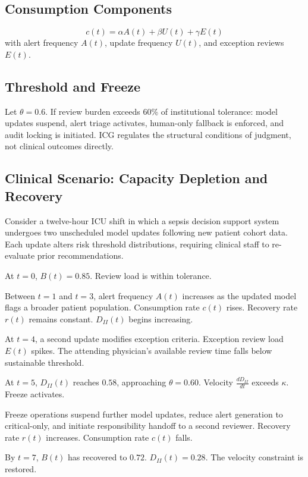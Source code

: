\documentclass[12pt]{article}
\begin{document}
\subsection{Consumption Components}
\[
c(t) = \alpha A(t) + \beta U(t) + \gamma E(t)
\]
with alert frequency $A(t)$, update frequency $U(t)$, and exception reviews $E(t)$.

\subsection{Threshold and Freeze}

Let $\theta = 0.6$. If review burden exceeds 60\% of institutional tolerance: model
updates suspend, alert triage activates, human-only fallback is enforced, and audit
locking is initiated. ICG regulates the structural conditions of judgment, not clinical
outcomes directly.

\subsection{Clinical Scenario: Capacity Depletion and Recovery}

Consider a twelve-hour ICU shift in which a sepsis decision support system undergoes
two unscheduled model updates following new patient cohort data. Each update alters
risk threshold distributions, requiring clinical staff to re-evaluate prior recommendations.

At $t = 0$, $B(t) = 0.85$. Review load is within tolerance.

Between $t = 1$ and $t = 3$, alert frequency $A(t)$ increases as the updated model flags
a broader patient population. Consumption rate $c(t)$ rises. Recovery rate $r(t)$ remains
constant. $D_{II}(t)$ begins increasing.

At $t = 4$, a second update modifies exception criteria. Exception review load $E(t)$
spikes. The attending physician's available review time falls below sustainable threshold.

At $t = 5$, $D_{II}(t)$ reaches $0.58$, approaching $\theta = 0.60$. Velocity
$\frac{dD_{II}}{dt}$ exceeds $\kappa$. Freeze activates.

Freeze operations suspend further model updates, reduce alert generation to critical-only,
and initiate responsibility handoff to a second reviewer. Recovery rate $r(t)$ increases.
Consumption rate $c(t)$ falls.

By $t = 7$, $B(t)$ has recovered to $0.72$. $D_{II}(t) = 0.28$. The velocity constraint
is restored.
\end{document}
